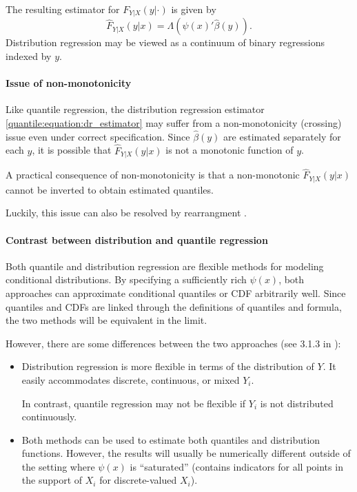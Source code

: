  The resulting estimator for $F_{Y|X}(y|\cdot)$ is given by
 \begin{equation}\label{quantile:equation:dr_estimator}
 	\hat{F}_{Y|X}(y|x)  = \Lambda\left(\psi(x)'\hat{\beta}(y) \right).
 \end{equation}  
 Distribution regression may be viewed as a continuum of binary regressions indexed by $y$.
 
 \paragraph{Issue of non-monotonicity}
 
 Like quantile regression, the distribution regression estimator \eqref{quantile:equation:dr_estimator} may suffer from a non-monotonicity (crossing) issue even under correct specification. Since $\hat{\beta}(y)$ are estimated separately for each $y$, it is possible that $\hat{F}_{Y|X}(y|x)$ is not a monotonic function of $y$. 
 
 A practical consequence of non-monotonicity is that a non-monotonic $\hat{F}_{Y|X}(y|x)$   cannot be inverted to obtain estimated quantiles.
 
  Luckily, this   issue can also be    resolved by rearrangment \citep{Chernozhukov2010QuantileProbabilityCurves, Chernozhukov2013b}.
 
 \paragraph{Contrast between distribution and quantile regression}
 
 	Both quantile and distribution regression are flexible methods for modeling conditional distributions. By specifying a sufficiently rich $\psi(x)$, both approaches can approximate conditional quantiles or CDF arbitrarily well.  Since quantiles and CDFs are linked through the definitions of quantiles and formula, the two methods will be equivalent in the limit.
 	
 	However, there are some differences between the two approaches (see 3.1.3 in \cite{Chernozhukov2013b}):
 	\begin{itemize}
 		\item Distribution regression is more flexible in terms of the distribution of $Y$. It easily accommodates discrete, continuous, or mixed $Y_i$. 
 		
 		In contrast, quantile regression may not be flexible if $Y_i$ is not distributed continuously.
 		
 		\item Both methods can be used to estimate both quantiles and distribution functions. However, the results will usually be numerically different outside of the setting where $\psi(x)$  is ``saturated'' (contains indicators for all points in the support of $X_i$ for discrete-valued $X_i$).
 	\end{itemize}
 	
